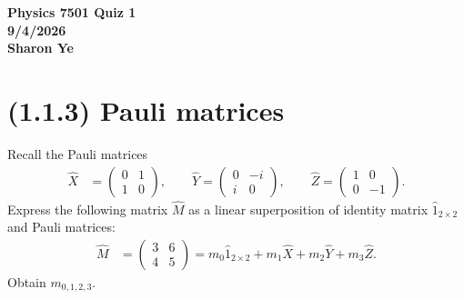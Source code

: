 \documentclass[11pt, answers]{exam}
\begin{document}
	\begin{center}
		\Large \bf Physics 7501 Quiz 1 \\ 9/4/2026 \\ Sharon Ye
	\end{center}
	
	\section*{(1.1.3) Pauli matrices}
	
	Recall the Pauli matrices
	\begin{align*}
		\hat{X}
		&= \begin{pmatrix}
			0 & 1 \\
			1 & 0
		\end{pmatrix},
		\qquad
		\hat{Y}
		= \begin{pmatrix}
			0 & -i \\
			i & 0
		\end{pmatrix},
		\qquad
		\hat{Z}
		= \begin{pmatrix}
			1 & 0 \\
			0 & -1
		\end{pmatrix}.
		\tag{1.1}
	\end{align*}
	Express the following matrix $\hat{M}$ as a linear superposition of
	identity matrix $\hat{1}_{2\times 2}$ and Pauli matrices:
	\begin{align*}
		\hat{M}
		&= \begin{pmatrix}
			3 & 6 \\
			4 & 5
		\end{pmatrix}
		= m_0\hat{1}_{2\times 2}
		+ m_1\hat{X}
		+ m_2\hat{Y}
		+ m_3\hat{Z}.
		\tag{1.2}
	\end{align*}
	Obtain $m_{0,1,2,3}$.
\end{document}
